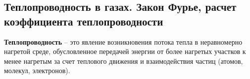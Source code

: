 \subsection{Теплопроводность в газах. Закон Фурье, расчет коэффициента теплопроводности}

\textbf{Теплопроводность} -- это явление возникновения потока тепла в неравномерно нагретой среде, обусловленное передачей энергии от более нагретых участков к менее нагретым за счет теплового движения и взаимодействия частиц (атомов, молекул, электронов).